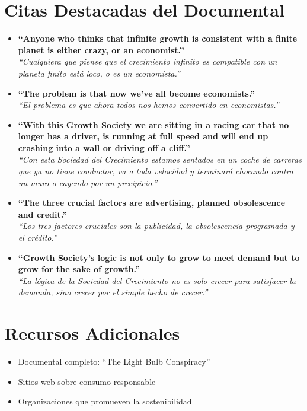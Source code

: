 \documentclass[12pt,a4paper]{article}
\begin{document}
\section*{Citas Destacadas del Documental}
\begin{itemize}
    \item \textbf{``Anyone who thinks that infinite growth is consistent with a finite planet is either crazy, or an economist.''} \\
    \textit{``Cualquiera que piense que el crecimiento infinito es compatible con un planeta finito está loco, o es un economista.''}
    
    \item \textbf{``The problem is that now we've all become economists.''} \\
    \textit{``El problema es que ahora todos nos hemos convertido en economistas.''}
    
    \item \textbf{``With this Growth Society we are sitting in a racing car that no longer has a driver, is running at full speed and will end up crashing into a wall or driving off a cliff.''} \\
    \textit{``Con esta Sociedad del Crecimiento estamos sentados en un coche de carreras que ya no tiene conductor, va a toda velocidad y terminará chocando contra un muro o cayendo por un precipicio.''}
    
    \item \textbf{``The three crucial factors are advertising, planned obsolescence and credit.''} \\
    \textit{``Los tres factores cruciales son la publicidad, la obsolescencia programada y el crédito.''}
    
    \item \textbf{``Growth Society's logic is not only to grow to meet demand but to grow for the sake of growth.''} \\
    \textit{``La lógica de la Sociedad del Crecimiento no es solo crecer para satisfacer la demanda, sino crecer por el simple hecho de crecer.''}
\end{itemize}

\section*{Recursos Adicionales}
\begin{itemize}
    \item Documental completo: ``The Light Bulb Conspiracy''
    \item Sitios web sobre consumo responsable
    \item Organizaciones que promueven la sostenibilidad
\end{itemize}
\end{document}
